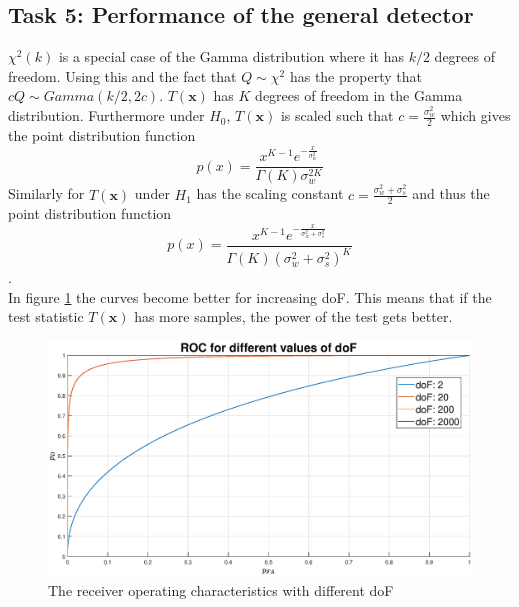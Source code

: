 \subsection{Task 5: Performance of the general detector}
$\chi^2(k)$ is a special case of the Gamma distribution where it has $k/2$ degrees of freedom. Using this and the fact that $Q\sim\chi^2$ has the property that $cQ\sim Gamma(k/2, 2c)$. $T(\mathbf{x})$ has $K$ degrees of freedom in the Gamma distribution. Furthermore under $H_0$, $T(\mathbf{x})$ is scaled such that $c = \frac{\sigma_w^2}{2}$ which gives the point distribution function
\begin{equation}
    p(x) = \frac{x^{K-1}e^{-\frac{x}{\sigma_w^2}}}{\Gamma(K)\sigma_w^{2K}}
\end{equation}
Similarly for $T(\mathbf{x})$ under $H_1$ has the scaling constant $c = \frac{\sigma_w^2+\sigma_s^2}{2}$ and thus the point distribution function
\begin{equation}
    p(x) = \frac{x^{K-1}e^{-\frac{x}{\sigma_w^2+\sigma_s^2}}}{\Gamma(K)(\sigma_w^{2}+\sigma_s^2)^K}
\end{equation}.\\
In figure \ref{fig:roc} the curves become better for increasing doF. This means that if the test statistic $T(\mathbf{x})$ has more samples, the power of the test gets better.
\begin{figure}
    \centering
    \includegraphics[width=\textwidth]{figures/roc2.eps}
    \caption{The receiver operating characteristics with different doF}
    \label{fig:roc}
\end{figure}

